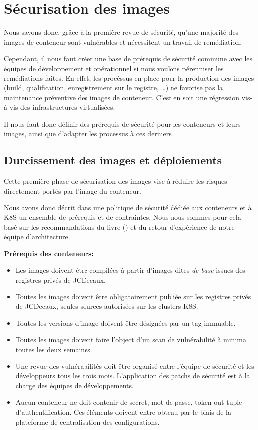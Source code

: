 \section{Sécurisation des images}
Nous savons donc, grâce à la première revue de sécurité, qu'une majorité des images de conteneur sont vulnérables et 
nécessitent un travail de remédiation.

Cependant, il nous faut créer une base de prérequis de sécurité commune avec les équipes de développement et 
opérationnel si nous voulons pérenniser les remédiations faites. 
\newline En effet, les procéssus en place pour la production des images (\ie build, qualification, enregistrement sur le
registre, \dots) ne favorise pas la maintenance préventive des images de conteneur. C'est en soit une régression 
vis-à-vis des infrastructures virtualisées.

Il nous faut donc définir des prérequis de sécurité pour les conteneurs et leurs images, ainsi que d'adapter les processus
à ces derniers.

\subsection{Durcissement des images et déploiements}
Cette première phase de sécurisation des images vise à réduire les risques directement portés par l'image du conteneur.

Nous avons donc décrit dans une politique de sécurité dédiée aux conteneurs et à \ac{K8S} un ensemble de prérequis et de 
contraintes. Nous nous sommes pour cela basé sur les recommandations du livre 
(\citeauthor{kub_sercuity_rice_2018})\autocite{kub_sercuity_rice_2018} et du retour d'expérience de notre équipe 
d'architecture.

\textbf{Prérequis des conteneurs:}
\begin{itemize}
    \item Les images doivent être compilées à partir d'images dites \emph{de base} issues des registres privés de JCDecaux.
    \item Toutes les images doivent être obligatoirement publiée sur les registres privés de JCDecaux, seules sources 
    autorisées sur les clusters \ac{K8S}.
    \item Toutes les versions d'image doivent être désignées par un tag immuable.
    \item Toutes les images doivent faire l'object d'un scan de vulnérabilité à minima toutes les deux semaines.
    \item Une revue des vulnérabilités doit être organisé entre l'équipe de sécurité et les développeurs tous les trois mois.
    L'application des patchs de sécurité est à la charge des équipes de développements.
    \item Aucun conteneur ne doit contenir de secret, mot de passe, token out tuple d'authentification. Ces éléments doivent
    entre obtenu par le biais de la plateforme de centralisation des configurations.
\end{itemize}

